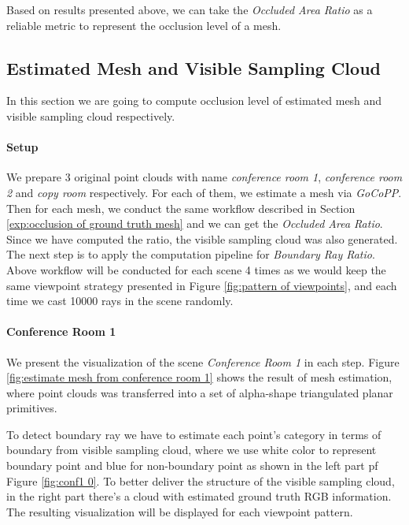 \documentclass[11pt, a4paper,oneside,chapterprefix=false]{scrbook}
\begin{document}
Based on results presented above, we can take the \emph{Occluded Area Ratio} as a reliable metric to represent the occlusion level of a mesh.

\subsection{Estimated Mesh and Visible Sampling Cloud}

In this section we are going to compute occlusion level of estimated mesh and visible sampling cloud respectively. 

\paragraph{Setup}

We prepare 3 original point clouds with name \emph{conference room 1}, \emph{conference room 2} and \emph{copy room} respectively. For each of them, we estimate a mesh via \emph{GoCoPP}. Then for each mesh, we conduct the same workflow described in Section \ref{exp:occlusion of ground truth mesh} and we can get the \emph{Occluded Area Ratio}. Since we have computed the ratio, the visible sampling cloud was also generated. The next step is to apply the computation pipeline for \emph{Boundary Ray Ratio}. Above workflow will be conducted for each scene 4 times as we would keep the same viewpoint strategy presented in Figure \ref{fig:pattern of viewpoints}, and each time we cast 10000 rays in the scene randomly.    

\paragraph{Conference Room 1} \label{par:conf1 result}

We present the visualization of the scene \emph{Conference Room 1} in each step. Figure \ref{fig:estimate mesh from conference room 1} shows the result of mesh estimation, where point clouds was transferred into a set of alpha-shape triangulated planar primitives.

\vspace{10pt}

To detect boundary ray 
we have to estimate each point's category in terms of boundary from visible sampling cloud, where we use white color to represent boundary point and blue for non-boundary point as shown in the left part pf Figure \ref{fig:conf1 0}. To better deliver the structure of the visible sampling cloud, in the right part there's a cloud with estimated ground truth RGB information. The resulting visualization will be displayed for each viewpoint pattern.
\end{document}
